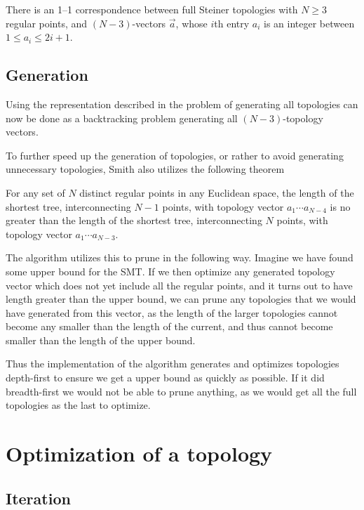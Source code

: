 There is an 1--1 correspondence between full Steiner topologies with $N \ge 3$
regular points, and $(N-3)$-vectors $\vec{a}$, whose $i$th entry $a_i$ is an
integer between $1 \le a_i \le 2 i + 1$.


\subsection{Generation}
\label{sec:generation}

Using the representation described in  the problem of
generating all topologies can now be done as a backtracking problem generating
all $(N-3)$-topology vectors.


To further speed up the generation of topologies, or rather to avoid generating
unnecessary topologies, Smith also utilizes the following theorem

\begin{theorem}
For any set of $N$ distinct regular points in any Euclidean space, the length of
the shortest tree, interconnecting $N-1$ points, with topology vector $a_1
\cdots a_{N-4}$ is no greater than the length of the shortest tree,
interconnecting $N$ points, with topology vector $a_1 \cdots a_{N-3}$.
\end{theorem}


The algorithm utilizes this to prune in the following way. Imagine we have found
some upper bound for the \ac{SMT}. If we then optimize any generated topology
vector which does not yet include all the regular points, and it turns out to
have length greater than the upper bound, we can prune any topologies that we
would have generated from this vector, as the length of the larger topologies
cannot become any smaller than the length of the current, and thus cannot become
smaller than the length of the upper bound.

Thus the implementation of the algorithm generates and optimizes topologies
depth-first to ensure we get a upper bound as quickly as possible. If it did
breadth-first we would not be able to prune anything, as we would get all the
full topologies as the last to optimize.

\section{Optimization of a topology}
\label{sec:optim-topol}


\subsection{Iteration}
\label{sec:iter-fixm-could}



